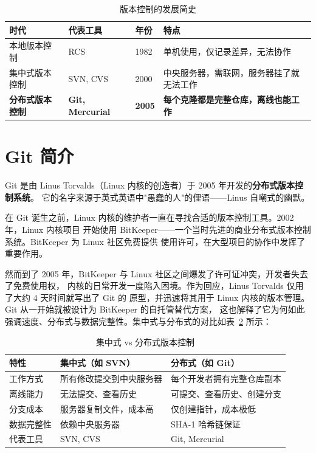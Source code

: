 \documentclass[12pt,a4paper,openany]{ctexbook}
\begin{document}
\begin{table}[H]\centering
\caption{版本控制的发展简史}\label{tab:vc-history}

{\renewcommand{\arraystretch}{1.3}\setlength{\tabcolsep}{6pt}\begin{tabularx}{\textwidth}{l l l >{\raggedright\arraybackslash}X}
\toprule
\textbf{时代} & \textbf{代表工具} & \textbf{年份} & \textbf{特点} \\
\midrule
本地版本控制 & RCS & 1982 & 单机使用，仅记录差异，无法协作 \\
集中式版本控制 & SVN, CVS & 2000 & 中央服务器，需联网，服务器挂了就无法工作 \\
\textbf{分布式版本控制} & \textbf{Git, Mercurial} & \textbf{2005} & \textbf{每个克隆都是完整仓库，离线也能工作} \\
\bottomrule
\end{tabularx}}
\end{table}

\section{Git 简介}

Git 是由 Linus Torvalds（Linux 内核的创造者）于 2005 年开发的\textbf{分布式版本控制系统}。
它的名字来源于英式英语中"愚蠢的人"的俚语——Linus 自嘲式的幽默。

在 Git 诞生之前，Linux 内核的维护者一直在寻找合适的版本控制工具。2002 年，Linux 内核项目
开始使用 BitKeeper——一个当时先进的商业分布式版本控制系统。BitKeeper 为 Linux 社区免费提供
使用许可，在大型项目的协作中发挥了重要作用。

然而到了 2005 年，BitKeeper 与 Linux 社区之间爆发了许可证冲突，开发者失去了免费使用权，
内核的日常开发一度陷入困境。作为回应，Linus Torvalds 仅用了大约 4 天时间就写出了 Git 的
原型，并迅速将其用于 Linux 内核的版本管理。Git 从一开始就被设计为 BitKeeper 的自托管替代方案，
这也解释了它为何如此强调速度、分布式与数据完整性。集中式与分布式的对比如表~\ref{tab:centralized-vs-distributed} 所示：

\begin{table}[H]\centering
\caption{集中式 vs 分布式版本控制}\label{tab:centralized-vs-distributed}
{\renewcommand{\arraystretch}{1.3}\setlength{\tabcolsep}{6pt}\begin{tabularx}{\textwidth}{l >{\raggedright\arraybackslash}X >{\raggedright\arraybackslash}X}
\toprule
\textbf{特性} & \textbf{集中式（如 SVN）} & \textbf{分布式（如 Git）} \\
\midrule
工作方式 & 所有修改提交到中央服务器 & 每个开发者拥有完整仓库副本 \\
离线能力 & 无法提交、查看历史 & 可提交、查看历史、创建分支 \\
分支成本 & 服务器复制文件，成本高 & 仅创建指针，成本极低 \\
数据完整性 & 依赖中央服务器 & SHA-1 哈希链保证 \\
代表工具 & SVN, CVS & Git, Mercurial \\
\bottomrule
\end{tabularx}}
\end{table}
\end{document}
